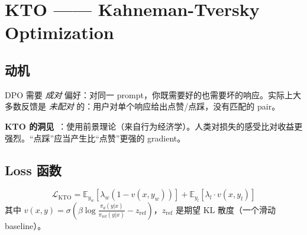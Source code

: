 \section{KTO —— Kahneman-Tversky Optimization}
\label{sec:kto}

\subsection{动机}
\label{motivation-1}

DPO 需要 \emph{成对} 偏好：对同一 prompt，你既需要好的也需要坏的响应。实际上大多数反馈是 \emph{未配对} 的：用户对单个响应给出点赞/点踩，没有匹配的 pair。

\textbf{KTO 的洞见}~\cite{ethayarajh2024kto}：使用前景理论（来自行为经济学）。人类对损失的感受比对收益更强烈。“点踩”应当产生比“点赞”更强的 gradient。

\subsection{Loss 函数}
\label{loss-function}

\begin{equation}
\boxed{\mathcal{L}_\text{KTO} = \mathbb{E}_{y_w}\left[\lambda_w (1 - v(x, y_w))\right] + \mathbb{E}_{y_l}\left[\lambda_l \cdot v(x, y_l)\right]}
\end{equation}
 其中 $v(x,y) = \sigma\left(\beta \log\frac{\pi_\theta(y|x)}{\pi_\text{ref}(y|x)} - z_\text{ref}\right)$，$z_\text{ref}$ 是期望 KL 散度（一个滑动 baseline）。

